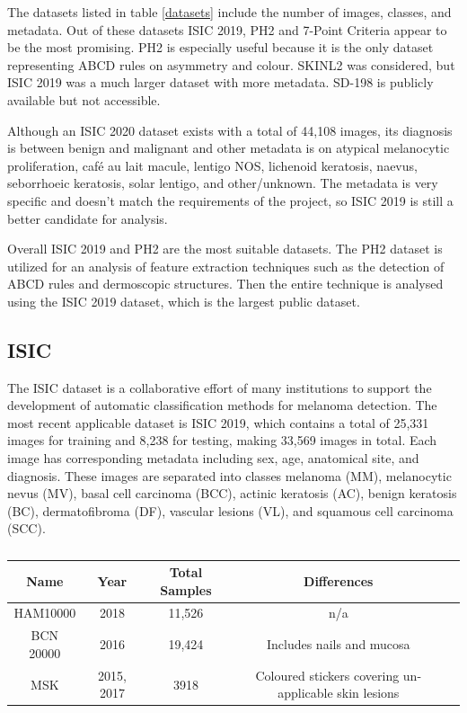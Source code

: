 The datasets listed in table \ref{datasets} include the number of images, classes, and metadata. Out of these datasets ISIC 2019, PH2 and 7-Point Criteria appear to be the most promising. PH2 is especially useful because it is the only dataset representing ABCD rules on asymmetry and colour. SKINL2 was considered, but ISIC 2019 was a much larger dataset with more metadata. SD-198 is publicly available but not accessible.

Although an ISIC 2020 dataset exists with a total of 44,108 images, its diagnosis is between benign and malignant and other metadata is on atypical melanocytic proliferation, café au lait macule, lentigo NOS, lichenoid keratosis, naevus, seborrhoeic keratosis, solar lentigo, and other/unknown. The metadata is very specific and doesn't match the requirements of the project, so ISIC 2019 is still a better candidate for analysis.

Overall ISIC 2019 and PH2 are the most suitable datasets. The PH2 dataset is utilized for an analysis of feature extraction techniques such as the detection of ABCD rules and dermoscopic structures. Then the entire technique is analysed using the ISIC 2019 dataset, which is the largest public dataset.

\subsection{ISIC}
The ISIC dataset is a collaborative effort of many institutions to support the development of automatic classification methods for melanoma detection. The most recent applicable dataset is ISIC 2019, which contains a total of 25,331 images for training and 8,238 for testing, making 33,569 images in total. Each image has corresponding metadata including sex, age, anatomical site, and diagnosis. These images are separated into classes melanoma (MM), melanocytic nevus (MV), basal cell carcinoma (BCC), actinic keratosis (AC), benign keratosis (BC), dermatofibroma (DF), vascular lesions (VL), and squamous cell carcinoma (SCC). 




\begin{table}
	\small
	\begin{tabular}{|c|c|c|c|c|}
		\hline
		Name & Year & Total Samples & Differences \\
		\hline
		HAM10000 & 2018 & 11,526 & n/a
		\\
		\hline
		BCN 20000 & 2016 & 19,424 & Includes nails and mucosa
		\\
		\hline
		MSK & 2015, 2017 & 3918 & Coloured stickers covering un-applicable skin lesions
		\\
		\hline	
	\end{tabular}
	\caption{}
\end{table} \label{ISIC_AF}

